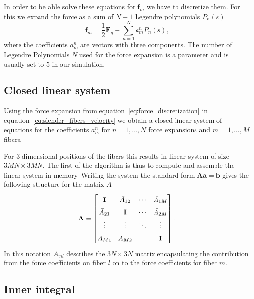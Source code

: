 \documentclass[a4paper,11pt]{kth-mag}
\begin{document}
In order to be able solve these equations for $\mathbf{f}_m$ we have to discretize them. For this we expand the force as a sum of $N+1$ Legendre polynomials $P_n(s)$
\begin{equation}
  \label{eq:force_discretization}
  \mathbf{f}_m = \frac{1}{2}\mathbf{F}_g + \sum_{n=1}^{N}a_{m}^{n} P_n(s) \text{,}
\end{equation}
where the coefficients $a_{m}^{n}$ are vectors with three components. The number of Legendre Polynomials $N$ used for the force expansion is a parameter and is usually set to $5$ in our simulation.

\subsection{Closed linear system}

Using the force expansion from equation~\ref{eq:force_discretization} in equation~\ref{eq:slender_fibers_velocity} we obtain a closed linear system of equations for the coefficients $a_{m}^{n}$ for $n=1,\dots,N$ force expansions and $m = 1,\dots,M$ fibers.

For 3-dimensional positions of the fibers this results in linear system of size $3MN\times3MN$. The first of the algorithm is thus to compute and assemble the linear system in memory. Writing the system the standard form $\mathbf{A}\mathbf{\bar{a}}=\mathbf{b}$ gives the following structure for the matrix $A$
\begin{equation}
  \label{eq:matrix_structure}
  \renewcommand\arraystretch{1.5}
  \mathbf{A} =
  \begin{bmatrix}
    \mathbf{I} & \bar{A}_{12} & \cdots & \bar{A}_{1M} \\
    \bar{A}_{21} & \mathbf{I} & \cdots & \bar{A}_{2M} \\
    \vdots & \vdots & \ddots & \vdots \\
    \bar{A}_{M1} & \bar{A}_{M2} & \cdots & \mathbf{I}
  \end{bmatrix} \text{.}
\end{equation}
In this notation $\bar{A}_{ml}$ describes the $3N\times3N$ matrix encapsulating the contribution from the force coefficients on fiber $l$ on to the force coefficients for fiber $m$.

\subsection{Inner integral}
\label{subsec:inner_integral}
\end{document}

